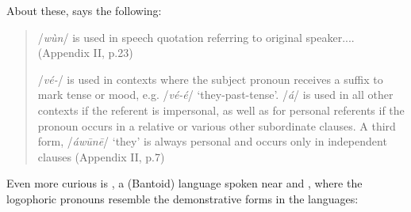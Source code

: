 \documentclass[output=paper]{langsci/langscibook}
\begin{document}
\begin{table}
\caption{Lamnso’ personal pronouns including logophoric}
 \label{extab:grassfields:12}    
\end{table}

\newpage 
\noindent  
About these, \citet[Appendix II]{Grebe1982} says the following:

\begin{quote}
  /\textit{wùn}/ is used in speech quotation referring to original speaker.... (Appendix II, p.23)

  /\textit{vé-}/ is used in contexts where the subject pronoun receives a suffix to mark tense or mood, e.g. /\textit{vé-é}/ ‘they-past-tense’. /\textit{á}/ is used in all other contexts if the referent is impersonal, as well as for personal referents if the pronoun occurs in a relative or various other subordinate clauses. A third form, /\textit{áwūnē}/ ‘they’ is always personal and occurs only in independent clauses (Appendix II, p.7)

\end{quote}


  Even more curious is , a  (Bantoid) language spoken near  and  \citep[15, 20]{Hyman1981}, where the logophoric pronouns resemble the demonstrative forms in the  languages:
\end{document}
